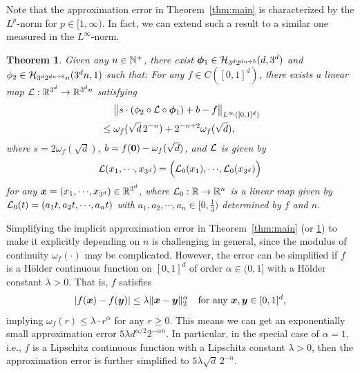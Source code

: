 \documentclass[nohyperref]{article}
\theoremstyle{plain}
\newtheorem{theorem}{Theorem}[section]
\theoremstyle{definition}
\theoremstyle{remark}
\begin{document}
Note that 
the approximation error in Theorem~\ref{thm:main} 
is characterized by the $L^p$-norm for $p\in [1,\infty)$. In fact, we can extend such a result to a similar one measured in the $L^\infty$-norm.
\begin{theorem}%
	\label{thm:mainInfty}
	Given any $n\in\N^+$, there exist ${\bm{\phi}}_1\in {\mathcal{H}}_{ 3^d2^{dn+5} }(d,{3^d})$ and $\phi_2\in {\mathcal{H}}_{3^d2^{dn+8}n}( {3^dn},1)$ such that: For any $f\in C([0,1]^d)$, there exists a linear map $\calL:\R^{3^d}\to \R^{3^dn}$ satisfying
	\begin{equation*}
\begin{split}
	&\quad\  \big\|s\cdot(\phi_2\circ {\mathcal{L}} \circ{\bm{\phi}}_1)+b-f\big\|_{L^\infty([0,1]^d)}\\
	&\le \omega_f(\sqrt{d}\, 2^{-n})+2^{-n+2}\omega_f(\sqrt{d}),
\end{split}
	\end{equation*}
	where $s=2\omega_f(\sqrt{d})$, $b=f({\bm{0}})-\omega_f(\sqrt{d})$, and ${\mathcal{L}}$ is given by \[\calL(x_1,\cdots,x_{3^d})=\Big(\calL_0(x_1),\cdots,\calL_0(x_{3^d})\Big)\]
	for any $\bmx=(x_1,\cdots,x_{3^d})\in \R^{3^d}$,
	where $\calL_0:\R\to \R^n$ is a linear map given by $\calL_0(t)=(a_1t, a_2 t,\cdots,a_n t)$ with $a_1,a_2,\cdots,a_n\in [0,\tfrac{1}{3})$ determined by $f$ and $n$.
\end{theorem}



Simplifying the implicit approximation error in Theorem~\ref{thm:main} (or \ref{thm:mainInfty}) to make it explicitly depending on $n$ is challenging in general, since the modulus of continuity $\omega_f(\cdot)$ may be complicated. However, the error can be simplified if $f$ is a H{\"o}lder continuous function on $[0,1]^d$ of order $\alpha\in(0,1]$ with a H\"older constant $\lambda>0$.  That is, $f$ satisfies
\begin{equation*}\label{eqn:Holder}
	|f({\bm{x}})-f({\bm{y}})|\leq \lambda \|{\bm{x}}-{\bm{y}}\|_2^\alpha\quad \textnormal{for any ${\bm{x}},{\bm{y}}\in[0,1]^d$,}
\end{equation*}
implying $\omega_f(r)\le \lambda\cdot r^\alpha$ for any $r\ge 0$. This means we can get an exponentially small approximation error $5\lambda d^{\alpha/2}2^{-\alpha n}$. In particular, in the special case of $\alpha=1$, i.e., $f$ is a Lipschitz continuous function with a Lipschitz constant $\lambda>0$, then the approximation error  is further simplified to $5\lambda\sqrt{d}\,2^{-n}$.
\end{document}
